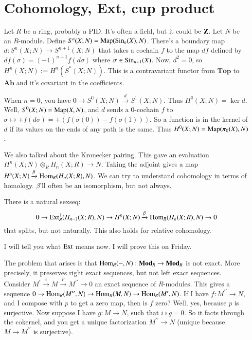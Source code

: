 \section{Cohomology, Ext, cup product}
Let $R$ be a ring, probably a PID. It's often a field, but it could be $\mathbf Z$. Let $N$ be an $R$-module. Define $S^n(X;N)=\operatorname{Map}(\mathrm{Sin}_n(X),N)$. There's a boundary map $d:S^n(X;N)\to S^{n+1}(X;N)$ that takes a cochain $f$ to the map $df$ defined by $df(\sigma)=(-1)^{n+1}f(d\sigma)$ where $\sigma\in \mathrm{Sin}_{n+1}(X)$. Now, $d^2=0$, so $ H^n(X;N):= H^n(S^\ast(X;N))$. This is a contravariant functor from $\mathbf{Top}$ to $\mathbf{Ab}$ and it's covariant in the coefficients. 

When $n=0$, you have $0\to S^0(X;N)\xrightarrow{d} S^1(X;N)$. Thus $ H^0(X;N)=\ker d$. Well, $S^0(X;N)=\operatorname{Map}(X,N)$, and $d$ sends a $0$-cochain $f$ to $\sigma\mapsto\pm f(d\sigma)=\pm(f(\sigma(0))-f(\sigma(1)))$. So a function is in the kernel of $d$ if its values on the ends of any path is the same. Thus $ H^0(X;N)=\operatorname{Map}(\pi_0(X),N)$.

We also talked about the Kronecker pairing. This gave an evaluation $ H^n(X;N)\otimes_R H_n(X;R)\to N$. Taking the adjoint gives a map $ H^n(X;N)\xrightarrow{\beta}\operatorname{Hom}_R( H_n(X;R),N)$. We can try to understand cohomology in terms of homology. $\beta$'ll often be an isomorphism, but not always.
\begin{theorem}
There is a natural sexseq:
\begin{equation*}
0\to\operatorname{Ext}^1_R( H_{n-1}(X;R),N)\to H^n(X;N)\xrightarrow{\beta}\operatorname{Hom}_R( H_n(X;R),N)\to 0
\end{equation*}
that splits, but not naturally. This also holds for relative cohomology.
\end{theorem}
I will tell you what $\operatorname{Ext}$ means now. I will prove this on Friday.

The problem that arises is that $\operatorname{Hom}_R(-,N):\mathbf{Mod}_R\to\mathbf{Mod}_R$ is not exact. More precisely, it preserves right exact sequences, but not left exact sequences. Consider $M^\prime\xrightarrow{i} M\xrightarrow{p} M^{\prime\prime}\to 0$ an exact sequence of $R$-modules. This gives a sequence $0\to \operatorname{Hom}_R(M^{\prime\prime},N)\to\operatorname{Hom}_R(M,N)\to \operatorname{Hom}_R(M^{\prime},N)$. If I have $f:M^{\prime\prime}\to N$, and I compose with $p$ to get a zero map, then is $f$ zero? Well, yes, because $p$ is surjective. Now suppose I have $g:M\to N$, such that $i\circ g=0$. So it facts through the cokernel, and you get a unique factorization $M^{\prime\prime}\to N$ (unique because $M\to M^{\prime\prime}$ is surjective).

